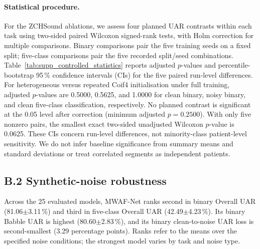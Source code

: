 \paragraph{Statistical procedure.}
For the ZCHSound ablations, we assess four planned UAR contrasts within each task using two-sided paired Wilcoxon signed-rank tests, with Holm correction for multiple comparisons. Binary comparisons pair the five training seeds on a fixed split; five-class comparisons pair the five recorded split/seed combinations. Table~\ref{tab:supp_controlled_statistics} reports adjusted $p$-values and percentile-bootstrap 95\,\% confidence intervals (CIs) for the five paired run-level differences. For heterogeneous versus repeated Coif4 initialisation under full training, adjusted $p$-values are 0.5000, 0.5625, and 1.0000 for clean binary, noisy binary, and clean five-class classification, respectively. No planned contrast is significant at the 0.05 level after correction (minimum adjusted $p=0.2500$). With only five nonzero pairs, the smallest exact two-sided unadjusted Wilcoxon $p$-value is 0.0625. These CIs concern run-level differences, not minority-class patient-level sensitivity. We do not infer baseline significance from summary means and standard deviations or treat correlated segments as independent patients.

\par\endgroup

\subsection*{B.2 Synthetic-noise robustness}

Across the 25 evaluated models, MWAF-Net ranks second in binary Overall UAR (81.06$\pm$3.11\,\%) and third in five-class Overall UAR (42.49$\pm$4.23\,\%). Its binary Babble UAR is highest (80.60$\pm$2.83\,\%), and its binary clean-to-noise UAR loss is second-smallest (3.29 percentage points). Ranks refer to the means over the specified noise conditions; the strongest model varies by task and noise type.

